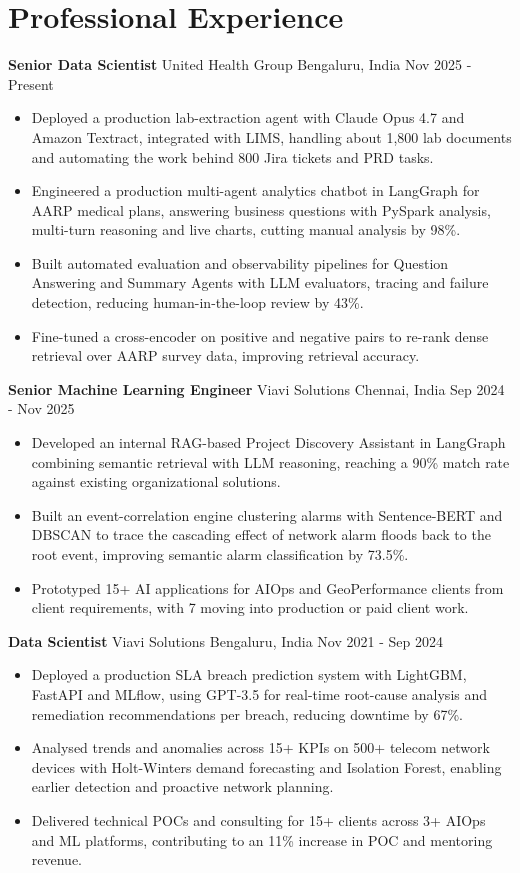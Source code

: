\documentclass[10pt,a4paper]{article}
\newcommand{\role}[4]{\textbf{#1} \textbar{} #2 \hfill #3 \textbar{} #4\par}
\begin{document}
\section{Professional Experience}
\role{Senior Data Scientist}{United Health Group}{Bengaluru, India}{Nov 2025 - Present}
\begin{itemize}
  \item Deployed a production lab-extraction agent with Claude Opus 4.7 and Amazon Textract, integrated with LIMS, handling about 1,800 lab documents and automating the work behind 800 Jira tickets and PRD tasks.
  \item Engineered a production multi-agent analytics chatbot in LangGraph for AARP medical plans, answering business questions with PySpark analysis, multi-turn reasoning and live charts, cutting manual analysis by 98\%.
  \item Built automated evaluation and observability pipelines for Question Answering and Summary Agents with LLM evaluators, tracing and failure detection, reducing human-in-the-loop review by 43\%.
  \item Fine-tuned a cross-encoder on positive and negative pairs to re-rank dense retrieval over AARP survey data, improving retrieval accuracy.
\end{itemize}
\vspace{3pt}
\role{Senior Machine Learning Engineer}{Viavi Solutions}{Chennai, India}{Sep 2024 - Nov 2025}
\begin{itemize}
  \item Developed an internal RAG-based Project Discovery Assistant in LangGraph combining semantic retrieval with LLM reasoning, reaching a 90\% match rate against existing organizational solutions.
  \item Built an event-correlation engine clustering alarms with Sentence-BERT and DBSCAN to trace the cascading effect of network alarm floods back to the root event, improving semantic alarm classification by 73.5\%.
  \item Prototyped 15+ AI applications for AIOps and GeoPerformance clients from client requirements, with 7 moving into production or paid client work.
\end{itemize}
\vspace{3pt}
\role{Data Scientist}{Viavi Solutions}{Bengaluru, India}{Nov 2021 - Sep 2024}
\begin{itemize}
  \item Deployed a production SLA breach prediction system with LightGBM, FastAPI and MLflow, using GPT-3.5 for real-time root-cause analysis and remediation recommendations per breach, reducing downtime by 67\%.
  \item Analysed trends and anomalies across 15+ KPIs on 500+ telecom network devices with Holt-Winters demand forecasting and Isolation Forest, enabling earlier detection and proactive network planning.
  \item Delivered technical POCs and consulting for 15+ clients across 3+ AIOps and ML platforms, contributing to an 11\% increase in POC and mentoring revenue.
\end{itemize}
\end{document}
